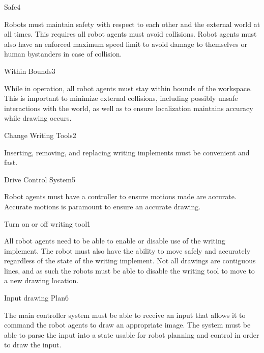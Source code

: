 \begin{functional_requirement}{Safe}{4}
\item Robots must maintain safety with respect to each other and the external world at all times. This requires all robot agents must avoid collisions. Robot agents must also have an enforced maximum speed limit to avoid damage to themselves or human bystanders in case of collision. 
\end{functional_requirement}

\begin{functional_requirement}{Within Bounds}{3}
\item While in operation, all robot agents must stay within bounds of the workspace. This is important to minimize external collisions, including possibly unsafe interactions with the world, as well as to ensure localization maintains accuracy while drawing occurs.
\end{functional_requirement}

\begin{functional_requirement}{Change Writing Tools}{2}
\item Inserting, removing, and replacing writing implements must be convenient and fast. 
\end{functional_requirement}

\begin{functional_requirement}{Drive Control System}{5}
\item Robot agents must have a controller to ensure motions made are accurate. Accurate motions is paramount to ensure an accurate drawing.
\end{functional_requirement}

\begin{functional_requirement}{Turn on or off writing tool}{1}
\item All robot agents need to be able to enable or disable use of the writing implement. The robot must also have the ability to move safely and accurately regardless of the state of the writing implement. Not all drawings are contiguous lines, and as such the robots must be able to disable the writing tool to move to a new drawing location.
\end{functional_requirement}

\begin{functional_requirement}{Input drawing Plan}{6}
\item The main controller system must be able to receive an input that allows it to command the robot agents to draw an appropriate image. The system must be able to parse the input into a state usable for robot planning and control in order to draw the input.
\end{functional_requirement}

